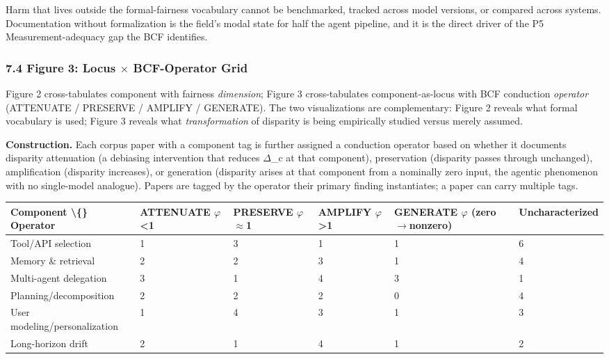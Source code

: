 \documentclass[10pt]{article}
\begin{document}
Harm that lives outside the formal-fairness vocabulary cannot be benchmarked, tracked across model versions, or compared across systems. Documentation without formalization is the field's modal state for half the agent pipeline, and it is the direct driver of the P5 Measurement-adequacy gap the BCF identifies.

\subsubsection*{7.4 Figure 3: Locus $\times$ BCF-Operator Grid}

Figure 2 cross-tabulates component with fairness \emph{dimension}; Figure 3 cross-tabulates component-as-locus with BCF conduction \emph{operator} (ATTENUATE / PRESERVE / AMPLIFY / GENERATE). The two visualizations are complementary: Figure 2 reveals what formal vocabulary is used; Figure 3 reveals what \emph{transformation} of disparity is being empirically studied versus merely assumed.

\textbf{Construction.} Each corpus paper with a component tag is further assigned a conduction operator based on whether it documents disparity attenuation (a debiasing intervention that reduces $\Delta$\_c at that component), preservation (disparity passes through unchanged), amplification (disparity increases), or generation (disparity arises at that component from a nominally zero input, the agentic phenomenon with no single-model analogue). Papers are tagged by the operator their primary finding instantiates; a paper can carry multiple tags.

\begin{center}\footnotesize
\begin{longtable}{|p{}|p{}|p{}|p{}|p{}|p{}|}
\hline \textbf{Component \textbackslash\{\} Operator} & \textbf{ATTENUATE $\varphi$<1} & \textbf{PRESERVE $\varphi$$\approx$1} & \textbf{AMPLIFY $\varphi$>1} & \textbf{GENERATE $\varphi$ (zero$\rightarrow$nonzero)} & \textbf{Uncharacterized} \\ \hline\endhead
Tool/API selection & 1 & 3 & 1 & 1 & 6 \\ \hline
Memory \& retrieval & 2 & 2 & 3 & 1 & 4 \\ \hline
Multi-agent delegation & 3 & 1 & 4 & 3 & 1 \\ \hline
Planning/decomposition & 2 & 2 & 2 & 0 & 4 \\ \hline
User modeling/personalization & 1 & 4 & 3 & 1 & 3 \\ \hline
Long-horizon drift & 2 & 1 & 4 & 1 & 2 \\ \hline
\end{longtable}\end{center}
\end{document}
